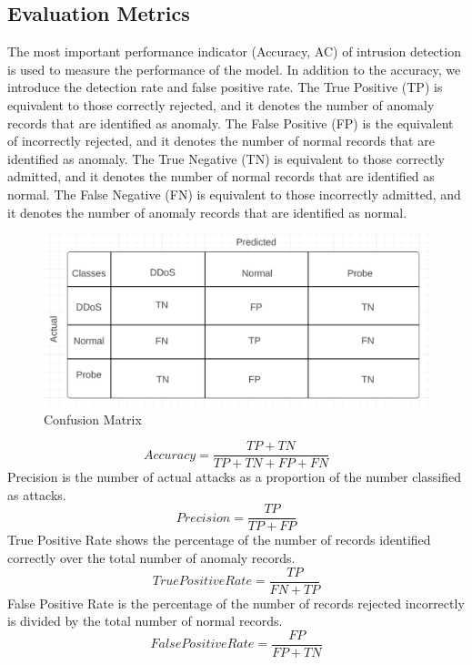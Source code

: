 \subsection{Evaluation Metrics}
\vspace{-18pt}
The most important performance indicator (Accuracy, AC) of intrusion detection is used to measure the performance of the model. In addition to the accuracy, we introduce the detection rate and false positive rate. The True Positive (TP) is equivalent to those correctly rejected, and it denotes the number of anomaly records that are identified as anomaly. The False Positive (FP) is the equivalent of incorrectly rejected, and it denotes the number of normal records that are identified as anomaly. The True Negative (TN) is equivalent to those correctly admitted, and it denotes the number of normal records that are identified as normal. The False Negative (FN) is equivalent to those incorrectly admitted, and it denotes the number of anomaly records that are identified as normal.
\begin{figure}[tbh] %
\begin{center}
	\includegraphics[width=6in]{images/confMat.png} 
	\caption{Confusion Matrix} %
	\label{Confusion Matrix} %
\end{center}
\end{figure}
\begin{equation}
Accuracy = \frac{TP + TN}{TP + TN + FP + FN}
\end{equation} 
Precision is the number of actual attacks as a proportion of the number classified as attacks.
\begin{equation}
Precision = \frac{TP}{TP + FP} 
\end{equation}
True Positive Rate shows the percentage of the number of records identified correctly over the total number of anomaly records.
\begin{equation}
True Positive Rate = \frac{TP}{FN + TP}
\end{equation}
False Positive Rate is the percentage of the number of records rejected incorrectly is divided by the total number of normal records.
\begin{equation}
False Positive Rate = \frac{FP}{FP + TN}
\end{equation}

